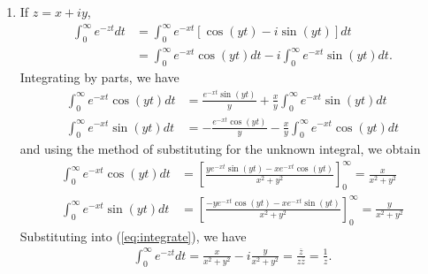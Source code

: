 \documentclass[a4paper,12pt]{article}
\begin{document}
\begin{enumerate}
\begin{enumerate}
            \item
                If $z = x + iy$,
                \begin{align}
                    \int_0^\infty e^{-zt} dt &= \int_0^\infty e^{-xt} [\cos(yt) - i\sin(yt)] dt \\
                    &= \int_0^\infty e^{-xt} \cos(yt) dt - i \int_0^\infty e^{-xt} \sin(yt) dt. \label{eq:integrate}
                \end{align}
                Integrating by parts, we have
                \begin{align*}
                    \int_0^\infty e^{-xt} \cos(yt) dt &= \frac{e^{-xt} \sin(yt)}{y} + \frac{x}{y} \int_0^\infty e^{-xt} \sin(yt) dt \\
                    \int_0^\infty e^{-xt} \sin(yt) dt &= -\frac{e^{-xt} \cos(yt)}{y} - \frac{x}{y} \int_0^\infty e^{-xt} \cos(yt) dt
                \end{align*}
                and using the method of substituting for the unknown integral, we obtain
                \begin{align*}
                    \int_0^\infty e^{-xt} \cos(yt) dt &= \left[ \frac{ye^{-xt} \sin(yt) - xe^{-xt} \cos(yt)}{x^2 + y^2} \right]_0^\infty = \frac{x}{x^2 + y^2} \\
                    \int_0^\infty e^{-xt} \sin(yt) dt &= \left[ \frac{-ye^{-xt} \cos(yt) - xe^{-xt} \sin(yt)}{x^2 + y^2} \right]_0^\infty = \frac{y}{x^2 + y^2}
                \end{align*}
                Substituting into (\ref{eq:integrate}), we have
                \begin{align*}
                    \int_0^\infty e^{-zt} dt = \frac{x}{x^2 + y^2} - i\frac{y}{x^2 + y^2} = \frac{\overline{z}}{z \overline{z}} = \frac{1}{z}.
                \end{align*}
        \end{enumerate}
\end{enumerate}
\end{document}

